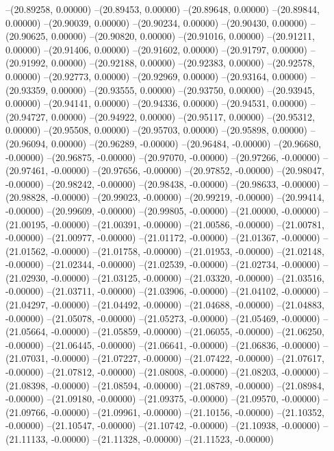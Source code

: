 --(20.89258, 0.00000)
--(20.89453, 0.00000)
--(20.89648, 0.00000)
--(20.89844, 0.00000)
--(20.90039, 0.00000)
--(20.90234, 0.00000)
--(20.90430, 0.00000)
--(20.90625, 0.00000)
--(20.90820, 0.00000)
--(20.91016, 0.00000)
--(20.91211, 0.00000)
--(20.91406, 0.00000)
--(20.91602, 0.00000)
--(20.91797, 0.00000)
--(20.91992, 0.00000)
--(20.92188, 0.00000)
--(20.92383, 0.00000)
--(20.92578, 0.00000)
--(20.92773, 0.00000)
--(20.92969, 0.00000)
--(20.93164, 0.00000)
--(20.93359, 0.00000)
--(20.93555, 0.00000)
--(20.93750, 0.00000)
--(20.93945, 0.00000)
--(20.94141, 0.00000)
--(20.94336, 0.00000)
--(20.94531, 0.00000)
--(20.94727, 0.00000)
--(20.94922, 0.00000)
--(20.95117, 0.00000)
--(20.95312, 0.00000)
--(20.95508, 0.00000)
--(20.95703, 0.00000)
--(20.95898, 0.00000)
--(20.96094, 0.00000)
--(20.96289, -0.00000)
--(20.96484, -0.00000)
--(20.96680, -0.00000)
--(20.96875, -0.00000)
--(20.97070, -0.00000)
--(20.97266, -0.00000)
--(20.97461, -0.00000)
--(20.97656, -0.00000)
--(20.97852, -0.00000)
--(20.98047, -0.00000)
--(20.98242, -0.00000)
--(20.98438, -0.00000)
--(20.98633, -0.00000)
--(20.98828, -0.00000)
--(20.99023, -0.00000)
--(20.99219, -0.00000)
--(20.99414, -0.00000)
--(20.99609, -0.00000)
--(20.99805, -0.00000)
--(21.00000, -0.00000)
--(21.00195, -0.00000)
--(21.00391, -0.00000)
--(21.00586, -0.00000)
--(21.00781, -0.00000)
--(21.00977, -0.00000)
--(21.01172, -0.00000)
--(21.01367, -0.00000)
--(21.01562, -0.00000)
--(21.01758, -0.00000)
--(21.01953, -0.00000)
--(21.02148, -0.00000)
--(21.02344, -0.00000)
--(21.02539, -0.00000)
--(21.02734, -0.00000)
--(21.02930, -0.00000)
--(21.03125, -0.00000)
--(21.03320, -0.00000)
--(21.03516, -0.00000)
--(21.03711, -0.00000)
--(21.03906, -0.00000)
--(21.04102, -0.00000)
--(21.04297, -0.00000)
--(21.04492, -0.00000)
--(21.04688, -0.00000)
--(21.04883, -0.00000)
--(21.05078, -0.00000)
--(21.05273, -0.00000)
--(21.05469, -0.00000)
--(21.05664, -0.00000)
--(21.05859, -0.00000)
--(21.06055, -0.00000)
--(21.06250, -0.00000)
--(21.06445, -0.00000)
--(21.06641, -0.00000)
--(21.06836, -0.00000)
--(21.07031, -0.00000)
--(21.07227, -0.00000)
--(21.07422, -0.00000)
--(21.07617, -0.00000)
--(21.07812, -0.00000)
--(21.08008, -0.00000)
--(21.08203, -0.00000)
--(21.08398, -0.00000)
--(21.08594, -0.00000)
--(21.08789, -0.00000)
--(21.08984, -0.00000)
--(21.09180, -0.00000)
--(21.09375, -0.00000)
--(21.09570, -0.00000)
--(21.09766, -0.00000)
--(21.09961, -0.00000)
--(21.10156, -0.00000)
--(21.10352, -0.00000)
--(21.10547, -0.00000)
--(21.10742, -0.00000)
--(21.10938, -0.00000)
--(21.11133, -0.00000)
--(21.11328, -0.00000)
--(21.11523, -0.00000)
